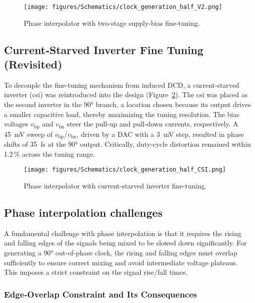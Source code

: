 \begin{figure}[h]
  \centering
  \texttt{[image: figures/Schematics/clock\_generation\_half\_V2.png]}
  \caption{Phase interpolator with two-stage supply-bias fine-tuning.}
  \label{fig:PI_2_schematic}
\end{figure}

\subsection{Current‑Starved Inverter Fine Tuning (Revisited)}\label{sec:csi}

To decouple the fine-tuning mechanism from induced DCD, a current‑starved inverter (\gls{csi}) was reintroduced into the design (Figure~\ref{fig:PI_csi_schematic}). The \gls{csi} was placed as the second inverter in the \ang{90} branch, a location chosen because its output drives a smaller capacitive load, thereby maximizing the tuning resolution. The bias voltages $v_\text{bp}$ and $v_\text{bn}$ steer the pull‑up and pull‑down currents, respectively. A \SI{45}{\milli\volt} sweep of $v_\text{bp}$/$v_\text{bn}$, driven by a DAC with a \SI{3}{\milli\volt} step, resulted in phase shifts of \SI{35}{\femto\second} at the \ang{90} output. Critically, duty‑cycle distortion remained within 1.2\,\% across the tuning range.

\begin{figure}[h]
  \centering
  \texttt{[image: figures/Schematics/clock\_generation\_half\_CSI.png]}
  \caption{Phase interpolator with current-starved inverter fine-tuning.}
  \label{fig:PI_csi_schematic}
\end{figure}

\subsection{Phase interpolation challenges}\label{sec:PI_challenges}

A fundamental challenge with phase interpolation is that it requires the rising and falling edges of the signals being mixed to be slowed down significantly. For generating a \ang{90} out-of-phase clock, the rising and falling edges must overlap sufficiently to ensure correct mixing and avoid intermediate voltage plateaus. This imposes a strict constraint on the signal rise/fall times. 

\subsubsection{Edge‑Overlap Constraint and Its Consequences}


